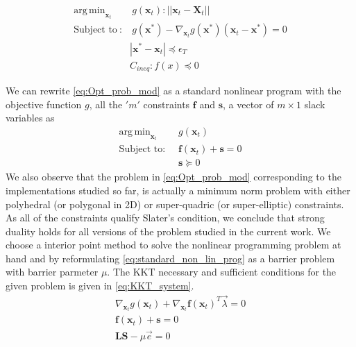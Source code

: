 \documentclass[12pt,a4]{article}
\DeclareMathOperator*{\argmin}{arg\,min}
\begin{document}
\begin{align}\label{eq:Opt_prob_mod}
 \argmin_{\textbf{x}_t} & ~g(\textbf{x}_t): \vert \vert \textbf{x}_t-\textbf{X}_t\vert \vert\\
\text{Subject to}~: &~ g(\textbf{x}^*)-\nabla_{\textbf{x}_t}g(\textbf{x}^*) (\textbf{x}_t-\textbf{x}^*) =0\nonumber\\ 
					& | \textbf{x}^*-\textbf{x}_t| \preceq  \epsilon_T \nonumber\\
					& C_{ineq}: f(x) \preceq 0 \nonumber
\end{align}

We can rewrite \cref{eq:Opt_prob_mod} as a standard nonlinear program with the objective function $g$, all the $'m'$ constraints $\textbf{f}$ and $\textbf{s}$, a vector of $m\times 1$ slack variables as 
\begin{align} \label{eq:standard_non_lin_prog}
\argmin_{\textbf{x}_t} ~& g(\textbf{x}_t) \\
\text{Subject to: }~ & \textbf{f}(\textbf{x}_t)+\textbf{s} =0 \nonumber\\
& \textbf{s}\succeq 0\nonumber
\end{align} 
We also observe that the problem in \cref{eq:Opt_prob_mod} corresponding to the implementations studied so far, is actually a minimum norm problem with either polyhedral (or polygonal in 2D)  or super-quadric (or super-elliptic) constraints. As all of the constraints qualify Slater's condition, we conclude that strong duality holds for all  versions of the problem studied in the current work. We choose a interior point method to solve the nonlinear programming problem at hand and by reformulating \cref{eq:standard_non_lin_prog} as a barrier problem with barrier parmeter $\mu$. The KKT necessary and sufficient conditions for the given problem is given in \cref{eq:KKT_system}.
\begin{align}\label{eq:KKT_system}
\nabla_{\textbf{x}_t}g(\textbf{x}_t)+\nabla_{\textbf{x}_t}\textbf{f}(\textbf{x}_t)^T \vec{\lambda} =0 \nonumber \\
\textbf{f}(\textbf{x}_t)+\textbf{s}=0 \\
\textbf{L}\textbf{S}-\mu \vec{e}=0 \nonumber
\end{align}
\end{document}
